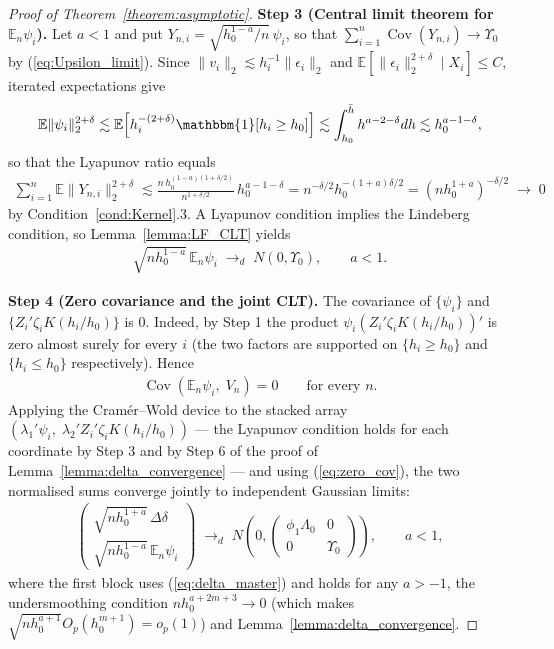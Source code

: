\documentclass{article}
\newcommand{\normm}[1]{\lVert#1\rVert}
\newcommand{\E}{\mathbb{E}}
\newcommand{\I}{\mathbbm{1}}
\DeclareMathOperator{\Cov}{Cov}
\begin{document}
\begin{appendices}
\begin{proof}[Proof of Theorem~\ref{theorem:asymptotic}]
\textbf{Step 3 (Central limit theorem for $\E_n\psi_i$).}
Let $a<1$ and put $Y_{n,i}=\sqrt{h_0^{1-a}/n}\,\psi_i$, so that
$\sum_{i=1}^n\Cov(Y_{n,i})\to\Upsilon_0$ by (\ref{eq:Upsilon_limit}). Since
$\normm{v_i}_2\lesssim h_i^{-1}\normm{\epsilon_i}_2$ and
$\E[\normm{\epsilon_i}_2^{2+\delta}\mid X_i]\le C$, iterated expectations give
\begin{align*}
    \E\normm{\psi_i}_2^{2+\delta}
    \lesssim \E\!\left[h_i^{-(2+\delta)}\I[h_i\ge h_0]\right]
    \lesssim \int_{h_0}^{\bar h}h^{a-2-\delta}dh\lesssim h_0^{a-1-\delta},
\end{align*}
so that the Lyapunov ratio equals
\begin{align*}
    \sum_{i=1}^n\E\normm{Y_{n,i}}_2^{2+\delta}
    \lesssim \frac{n\,h_0^{(1-a)(1+\delta/2)}}{n^{1+\delta/2}}\,h_0^{a-1-\delta}
    = n^{-\delta/2}h_0^{-(1+a)\delta/2}
    = \left(nh_0^{1+a}\right)^{-\delta/2}\;\to\;0
\end{align*}
by Condition~\ref{cond:Kernel}.3. A Lyapunov condition implies the Lindeberg
condition, so Lemma~\ref{lemma:LF_CLT} yields
\begin{align}\label{eq:psi_CLT}
    \sqrt{nh_0^{1-a}}\,\E_n\psi_i\;\to_d\;N\!\left(0,\Upsilon_0\right),
    \qquad a<1 .
\end{align}


\textbf{Step 4 (Zero covariance and the joint CLT).}
The covariance of $\{\psi_i\}$ and $\{Z_i'\zeta_iK(h_i/h_0)\}$ is $0$. Indeed, by Step 1 the product
$\psi_i\left(Z_i'\zeta_iK(h_i/h_0)\right)'$ is zero almost surely for every $i$
(the two factors are supported on $\{h_i\ge h_0\}$ and $\{h_i\le h_0\}$
respectively). Hence
\begin{align}\label{eq:zero_cov}
    \Cov\!\left(\E_n\psi_i,\;V_n\right)=0\qquad\text{for every }n .
\end{align}
Applying the Cramér--Wold device to the stacked array
$\left(\lambda_1'\psi_i,\;\lambda_2'Z_i'\zeta_iK(h_i/h_0)\right)$ — the
Lyapunov condition holds for each coordinate by Step 3 and by Step 6 of the
proof of Lemma~\ref{lemma:delta_convergence} — and using (\ref{eq:zero_cov}),
the two normalised sums converge jointly to independent Gaussian limits:
\begin{align}\label{eq:joint_CLT}
    \begin{pmatrix}
        \sqrt{nh_0^{1+a}}\,\Delta\delta\\[2pt]
        \sqrt{nh_0^{1-a}}\,\E_n\psi_i
    \end{pmatrix}
    \;\to_d\;
    N\!\left(0,\begin{pmatrix}\phi_1\Lambda_0&0\\0&\Upsilon_0\end{pmatrix}\right),
    \qquad a<1,
\end{align}
where the first block uses (\ref{eq:delta_master}) and holds for any $a>-1$, the undersmoothing condition
$nh_0^{a+2m+3}\to0$ (which makes $\sqrt{nh_0^{a+1}}O_p(h_0^{m+1})=o_p(1)$) and
Lemma~\ref{lemma:delta_convergence}.



\end{proof}
\end{appendices}
\end{document}
